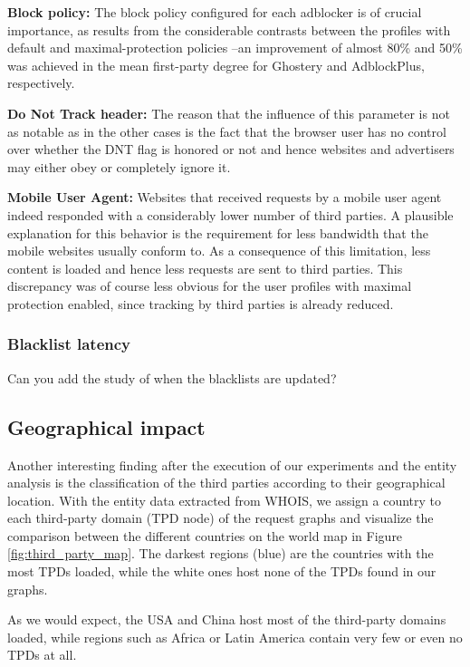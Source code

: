 \documentclass{sig-alternate}
\begin{document}
\textbf{Block policy:} The block policy configured for each adblocker is of crucial importance, as results from the considerable contrasts between the profiles with default and maximal-protection policies --an improvement of almost 80\% and 50\% was achieved in the mean first-party degree for Ghostery and AdblockPlus, respectively.

\textbf{Do Not Track header:} The reason that the influence of this parameter is not as notable as in the other cases is the fact that the browser user has no control over whether the DNT flag is honored or not and hence websites and advertisers may either obey or completely ignore it.

\textbf{Mobile User Agent:} Websites that received requests by a mobile user agent indeed responded with a considerably lower number of third parties. A plausible explanation for this behavior is the requirement for less bandwidth that the mobile websites usually conform to. As a consequence of this limitation, less content is loaded and hence less requests are sent to third parties. This discrepancy was of course less obvious for the user profiles with maximal protection enabled, since tracking by third parties is already reduced.

\subsubsection{Blacklist latency}
{\color{red}Can you add the study of when the blacklists are updated?}

\subsection{Geographical impact}
{\color{blue}
Another interesting finding after the execution of our experiments and the entity analysis is the classification of the third parties according to their geographical location. With the entity data extracted from WHOIS, we assign a country to each third-party domain (TPD node) of the request graphs and visualize the comparison between the different countries on the world map in Figure \ref{fig:third_party_map}. The darkest regions (blue) are the countries with the most TPDs loaded, while the white ones host none of the TPDs found in our graphs.

As we would expect, the USA and China host most of the third-party domains loaded, while regions such as Africa or Latin America contain very few or even no TPDs at all.
}
\end{document}
